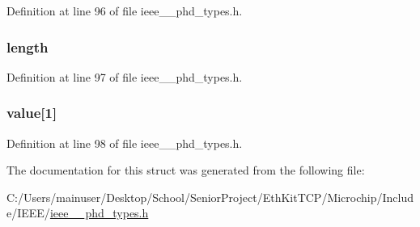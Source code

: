Definition at line 96 of file ieee\+\_\+\_\+phd\+\_\+types.\+h.

\hypertarget{struct___attribute_id_list_a3743679e4ff85e3e1b3fc2e59973fbb3}{}
\subsubsection[{length}]{ length}\label{struct___attribute_id_list_a3743679e4ff85e3e1b3fc2e59973fbb3}


Definition at line 97 of file ieee\+\_\+\_\+phd\+\_\+types.\+h.

\hypertarget{struct___attribute_id_list_a33f73b3d426a499e63aae9644dd8813a}{}
\subsubsection[{value}]{ value\mbox{[}1\mbox{]}}\label{struct___attribute_id_list_a33f73b3d426a499e63aae9644dd8813a}


Definition at line 98 of file ieee\+\_\+\_\+phd\+\_\+types.\+h.



The documentation for this struct was generated from the following file\+:\begin{DoxyCompactItemize}
\item 
C\+:/\+Users/mainuser/\+Desktop/\+School/\+Senior\+Project/\+Eth\+Kit\+T\+C\+P/\+Microchip/\+Include/\+I\+E\+E\+E/\hyperlink{ieee__11073__phd__types_8h}{ieee\+\_\+\_\+phd\+\_\+types.\+h}\end{DoxyCompactItemize}
